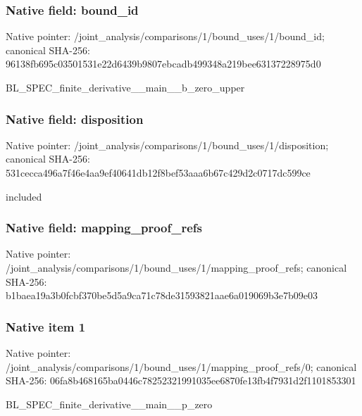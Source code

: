 \documentclass[10pt,a4paper]{article}
\begin{document}
\subsubsection{Native field: bound\_\allowbreak{}id}
Native pointer: /joint\_\allowbreak{}analysis/comparisons/1/bound\_\allowbreak{}uses/1/bound\_\allowbreak{}id; canonical SHA-256: 96138fb695c03501531e22d6439b9807ebcadb499348a219bee63137228975d0

\begingroup\raggedright\sloppy BL\_\allowbreak{}SPEC\_\allowbreak{}finite\_\allowbreak{}derivative\_\allowbreak{}\_\allowbreak{}main\_\allowbreak{}\_\allowbreak{}b\_\allowbreak{}zero\_\allowbreak{}upper\par\endgroup

\subsubsection{Native field: disposition}
Native pointer: /joint\_\allowbreak{}analysis/comparisons/1/bound\_\allowbreak{}uses/1/disposition; canonical SHA-256: 531cecca496a7f46e4aa9ef40641db12f8bef53aaa6b67c429d2c0717dc599ce

\begingroup\raggedright\sloppy included\par\endgroup

\subsubsection{Native field: mapping\_\allowbreak{}proof\_\allowbreak{}refs}
Native pointer: /joint\_\allowbreak{}analysis/comparisons/1/bound\_\allowbreak{}uses/1/mapping\_\allowbreak{}proof\_\allowbreak{}refs; canonical SHA-256: b1baea19a3b0fcbf370be5d5a9ca71c78de31593821aae6a019069b3e7b09e03

\subsubsection{Native item 1}
Native pointer: /joint\_\allowbreak{}analysis/comparisons/1/bound\_\allowbreak{}uses/1/mapping\_\allowbreak{}proof\_\allowbreak{}refs/0; canonical SHA-256: 06fa8b468165ba0446c78252321991035ee6870fe13fb4f7931d2f1101853301

\begingroup\raggedright\sloppy BL\_\allowbreak{}SPEC\_\allowbreak{}finite\_\allowbreak{}derivative\_\allowbreak{}\_\allowbreak{}main\_\allowbreak{}\_\allowbreak{}p\_\allowbreak{}zero\par\endgroup
\end{document}
